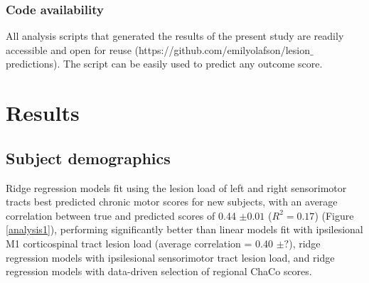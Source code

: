 \documentclass[10pt]{article}
\begin{document}
\subsubsection*{Code availability}
All analysis scripts that generated the results of the present study are readily accessible and open for reuse (https://github.com/emilyolafson/lesion$\_$predictions). The script can be easily used to predict any outcome score.

\section{Results}
\subsection*{Subject demographics}


Ridge regression models fit using the lesion load of left and right sensorimotor tracts best predicted chronic motor scores for new subjects, with an average correlation between true and predicted scores of 0.44 $\pm 0.01$ ($R^2 = 0.17$) (Figure \ref{analysis1}), performing significantly better than linear models fit with ipsilesional M1 corticospinal tract lesion load (average correlation = 0.40 $\pm ?$), ridge regression models with ipsilesional sensorimotor tract lesion load, and ridge regression models with data-driven selection of regional ChaCo scores.
\end{document}
